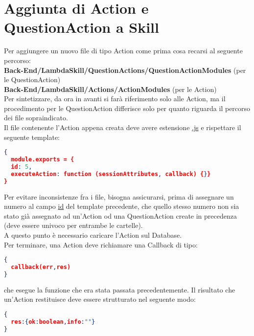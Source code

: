 \documentclass[../ManualeSviluppatore_v2.0.0.tex]{subfiles}
\begin{document}
\section{Aggiunta di Action e QuestionAction a Skill}
	
	Per aggiungere un nuovo file di tipo Action come prima cosa recarsi al seguente percorso:\\
	\textbf{Back-End/LambdaSkill/QuestionActions/QuestionActionModules} (per le QuestionAction)\\
	\textbf{Back-End/LambdaSkill/Actions/ActionModules} (per le Action)\\
	Per sintetizzare, da ora in avanti si farà riferimento solo alle Action, ma il procedimento per le QuestionAction differisce solo per quanto riguarda il percorso dei file sopraindicato.\\
	Il file contenente l'Action appena creata deve avere estensione \underline{.js} e rispettare il seguente template:
	\begin{lstlisting}[language=json,firstnumber=1]
{
  module.exports = {
  id: 5,
  executeAction: function (sessionAttributes, callback) {}}
}
	\end{lstlisting}
	Per evitare inconsistenze fra i file, bisogna assicurarsi, prima di assegnare un numero al campo \underline{id} del template precedente, che quello stesso numero non sia stato già assegnato ad un'Action od una QuestionAction create in precedenza (deve essere univoco per entrambe le cartelle).\\
	A questo punto è necessario caricare l'Action sul Database.\\
	Per terminare, una Action deve richiamare una Callback di tipo:
	\begin{lstlisting}[language=json,firstnumber=1]
{
  callback(err,res)
}
	\end{lstlisting}
	che esegue la funzione che era stata passata precedentemente.
	Il risultato che un'Action restituisce deve essere strutturato nel seguente modo:
	\begin{lstlisting}[language=json,firstnumber=1]
{
  res:{ok:boolean,info:""}
}
	\end{lstlisting}
	
\end{document}
